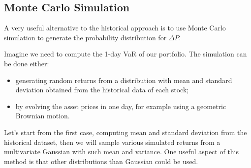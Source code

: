%
%
%
%
%
%

\subsection{Monte Carlo Simulation}
\label{monte-carlo-simulation}

A very useful alternative to the historical approach is to use Monte Carlo simulation to generate the probability distribution for $\Delta P$. 

Imagine we need to compute the 1-day VaR of our portfolio. The simulation can be done either:
\begin{itemize}
	\tightlist
	\item generating random returns from a distribution with mean and standard deviation obtained from the historical data of each stock;
	\item by evolving the asset prices in one day, for example using a geometric Brownian motion.
\end{itemize}
Let's start from the first case, computing mean and standard deviation from the historical dataset, then we will sample various simulated returns from a multivariate Gaussian with such mean and variance. One useful aspect of this method is that other distributions than Gaussian could be used. 

